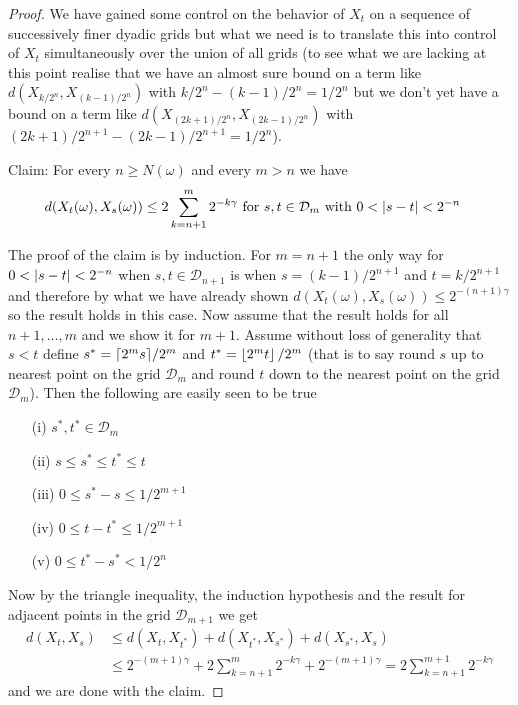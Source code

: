 \begin{proof}
We have gained some control on the behavior of $X_t$ on a sequence of
successively finer dyadic grids but what we need is to translate this into
control of $X_t$ simultaneously over the union of all grids (to see
what we are lacking at this point realise that we have an almost sure
bound on a term like $d(X_{k/2^n}, X_{(k-1)/2^n})$ with $k/2^n -
(k-1)/2^n = 1/2^n$ but we don't yet have a bound on a term like
$d(X_{(2k+1)/2^n}, X_{(2k-1)/2^n})$ with $(2k+1)/2^{n+1} -
(2k-1)/2^{n+1} = 1/2^n$).  

Claim: For every $n \geq N(\omega)$ and every $m > n$ we have 
\begin{align*}
d(X_t(\omega), X_s(\omega)) &\leq 2\sum_{k=n+1}^m 2^{-k\gamma} \text{
  for $s,t \in \mathcal{D}_m$ with $0 < \left \vert s-t \right \vert < 2^{-n}$}
\end{align*}

The proof of the claim is by induction.  For $m=n+1$ the only way for
$0 < \left \vert s-t \right \vert < 2^{-n}$ when $s,t \in \mathcal{D}_{n+1}$ is when
$s=(k-1)/2^{n+1}$ and $t=k/2^{n+1}$ and therefore by what we have
already shown $d(X_t(\omega), X_s(\omega)) \leq 2^{-(n+1)\gamma}$ so
the result holds in this case.  Now assume that the result holds for
all $n+1, \dotsc, m$ and we show it for $m+1$.  Assume without loss of
generality that $s < t$ define $s^* = \lceil 2^m s \rceil/2^m$ and $t^* =
\left \lfloor 2^m t \right \rfloor/2^m$ (that is to say round $s$ up
to nearest point on the grid $\mathcal{D}_m$ and round $t$ down to the
nearest point on the grid $\mathcal{D}_m$).  Then the following are
easily seen to be true
\begin{itemize}
\item[(i)] $s^*, t^* \in \mathcal{D}_m$
\item[(ii)] $s \leq s^* \leq t^*\leq t$
\item[(iii)] $0 \leq s^* - s \leq 1/2^{m+1}$
\item[(iv)] $0 \leq t - t^* \leq 1/2^{m+1}$
\item[(v)] $0 \leq t^* - s^* < 1/2^n$
\end{itemize}
Now by the triangle inequality, the induction hypothesis and the result for adjacent points in
the grid $\mathcal{D}_{m+1}$ we get
\begin{align*}
d(X_t, X_s) &\leq d(X_t, X_{t^*}) + d(X_{t^*}, X_{s^*}) + d(X_{s^*},
X_s)  \\
&\leq 2^{-(m+1)\gamma} + 2 \sum_{k=n+1}^m 2^{-k\gamma} +
2^{-(m+1)\gamma}  = 2 \sum_{k=n+1}^{m+1} 2^{-k\gamma}
\end{align*} 
and we are done with the claim.


\end{proof}
